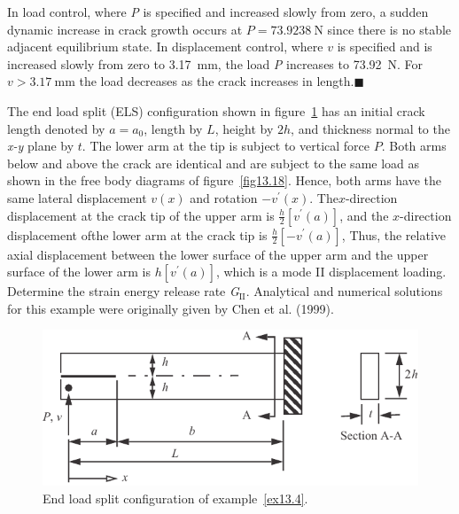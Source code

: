 \documentclass{AeroStructure-ERJohnson}
\begin{document}
\begin{example*}
In load control, where \textit{P} is specified and increased slowly from zero, a sudden dynamic increase in crack growth occurs at $P=73.9238 \mathrm{~N}$ since there is no stable adjacent equilibrium state. In displacement control, where $v$ is specified and is increased slowly from zero to 3.17~mm, the load \textit{P} increases to 73.92~N. For $v>3.17 \mathrm{~mm}$ the load decreases as the crack increases in length.\hfill$\blacksquare$
\end{example*}
\vspace*{2pt}
\pagebreak

\begin{example*}\label{ex13.4}The end load split (ELS) configuration shown in figure~\ref{fig13.17} has an initial crack length denoted by $a=a_{0}$, length by $L$, height by $2 h$, and thickness normal to the \textit{x-y} plane by $t$. The lower arm at the tip is subject to vertical force $P$. Both arms below and above the crack are identical and are subject to the same load as shown in the free body diagrams of figure~\ref{fig13.18}. Hence, both arms have the same lateral displacement $v(x)$ and rotation $-v^{\prime}(x)$. The\break $x$-direction displacement at the crack tip of the upper arm is $\frac{h}{2}\left[v^{\prime}(a)\right]$, and the $x$-direction displacement of\break the lower arm at the crack tip is $\frac{h}{2}\left[-v^{\prime}(a)\right]$, Thus, the relative axial displacement between the lower surface of the upper arm and the upper surface of the lower arm is $h\left[v^{\prime}(a)\right]$, which is a mode II displacement loading. Determine the strain energy release rate \textit{G}$_\textrm{II}$. Analytical and numerical solutions for this example were originally given by Chen et al. (1999).

\begin{figure}[!h]\vspace*{-6pt}
\centerline{\includegraphics{Figure_13-17.pdf}}
\caption{End load split configuration of example~\ref{ex13.4}.}\label{fig13.17}
\end{figure}


\end{example*}
\end{document}
